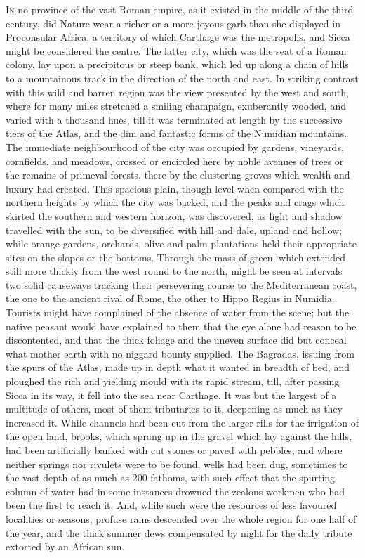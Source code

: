I\textsc{n} no province of the vast Roman empire, as it existed in the
middle of the third century, did Nature wear a richer or a more joyous
garb than she displayed in Proconsular Africa, a territory of which
Carthage was the metropolis, and Sicca might be considered the centre.
The latter city, which was the seat of a Roman colony, lay upon a
precipitous or steep bank, which led up along a chain of hills to a
mountainous track in the direction of the north and east. In striking
contrast with this wild and barren region was the view presented by
the west and south, where for many miles stretched a smiling champaign,
exuberantly wooded, and varied with a thousand hues, till it was
terminated at length by the successive tiers of the Atlas, and the dim
and fantastic forms of the Numidian mountains. The immediate
neighbourhood of the city was occupied by gardens, vineyards,
cornfields, and meadows, crossed or encircled here by noble
avenues of trees or the remains of primeval forests, there by the
clustering groves which wealth and luxury had created. This spacious
plain, though level when compared with the northern heights by which
the city was backed, and the peaks and crags which skirted the
southern and western horizon, was discovered, as light and shadow
travelled with the sun, to be diversified with hill and dale, upland
and hollow; while orange gardens, orchards, olive and palm plantations
held their appropriate sites on the slopes or the bottoms. Through the
mass of green, which extended still more thickly from the west round
to the north, might be seen at intervals two solid causeways tracking
their persevering course to the Mediterranean coast, the one to the
ancient rival of Rome, the other to Hippo Regius in Numidia. Tourists
might have complained of the absence of water from the scene; but the
native peasant would have explained to them that the eye alone had
reason to be discontented, and that the thick foliage and the uneven
surface did but conceal what mother earth with no niggard bounty
supplied. The Bagradas, issuing from the spurs of the Atlas, made up
in depth what it wanted in breadth of bed, and ploughed the rich and
yielding mould with its rapid stream, till, after passing Sicca in its
way, it fell into the sea near Carthage. It was but the largest of a
multitude of others, most of them tributaries to it, deepening as much
as they increased it. While channels had been cut from the larger
rills for the irrigation of the open land, brooks, which sprang up
in the gravel which lay against the hills, had been artificially
banked with cut stones or paved with pebbles; and where neither
springs nor rivulets were to be found, wells had been dug, sometimes
to the vast depth of as much as 200 fathoms, with such effect that the
spurting column of water had in some instances drowned the zealous
workmen who had been the first to reach it. And, while such were the
resources of less favoured localities or seasons, profuse rains
descended over the whole region for one half of the year, and the
thick summer dews compensated by night for the daily tribute extorted
by an African sun.

